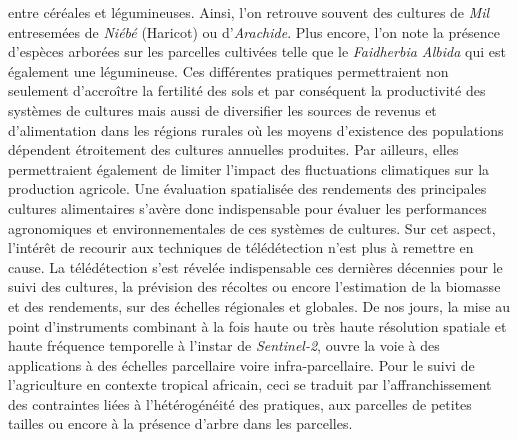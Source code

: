 entre céréales et légumineuses. Ainsi, l'on retrouve souvent des cultures de \emph{Mil} entresemées de \emph{Niébé} (Haricot) ou d'\emph{Arachide}. Plus encore, l'on note la 
présence d'espèces arborées sur les parcelles cultivées telle que le \emph{Faidherbia Albida} qui est également une légumineuse. Ces différentes pratiques permettraient non seulement d’accroître la fertilité des 
sols et par conséquent la productivité des systèmes de cultures mais aussi de diversifier les sources de revenus et d’alimentation dans les régions rurales où les moyens d’existence
des populations dépendent étroitement des cultures annuelles produites. Par ailleurs, elles permettraient également de limiter l’impact des fluctuations climatiques sur la 
production agricole. Une évaluation spatialisée des rendements des principales cultures alimentaires s'avère donc indispensable pour évaluer les performances agronomiques et 
environnementales de ces systèmes de cultures. Sur cet aspect, l'intérêt de recourir aux techniques de télédétection n'est plus à remettre en cause. La télédétection s'est révelée 
indispensable ces dernières décennies pour le suivi des cultures, la prévision des récoltes ou encore l'estimation de la biomasse et des rendements, sur des échelles régionales et 
globales. De nos jours, la mise au point d'instruments combinant à la fois haute ou très haute résolution spatiale et haute fréquence temporelle à l'instar de \emph{Sentinel-2}, ouvre la
voie à des applications à des échelles parcellaire voire infra-parcellaire. Pour le suivi de l'agriculture en contexte tropical africain, ceci se traduit par l'affranchissement des contraintes liées à 
l'hétérogénéité des pratiques, aux parcelles de petites tailles ou encore à la présence d’arbre dans les parcelles.
